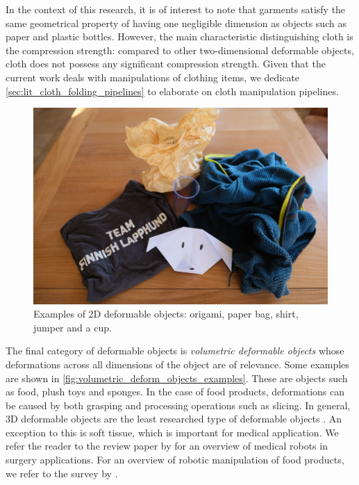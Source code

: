 In the context of this research, it is of interest to note that garments satisfy the same geometrical property of having one negligible dimension as objects such as paper and plastic bottles. However, the main characteristic distinguishing cloth is the compression strength: compared to other two-dimensional deformable objects, cloth does not possess any significant compression strength. Given that the current work deals with manipulations of clothing items, we dedicate \cref{sec:lit_cloth_folding_pipelines} to elaborate on cloth manipulation pipelines.

\begin{figure}[htbp!]
    \centering
    \includegraphics[keepaspectratio,width=\textwidth]{figures/fig_2d_deformables_ex.JPG}
    \caption[Examples of 2D deformable objects]{Examples of 2D deformable objects: origami, paper bag, shirt, jumper and a cup.}
    \label{fig:planar_deform_objects_examples}
\end{figure}

The final category of deformable objects is \textit{volumetric deformable objects} whose deformations across all dimensions of the object are of relevance. Some examples are shown in \cref{fig:volumetric_deform_objects_examples}. These are objects such as food, plush toys and sponges. In the case of food products, deformations can be caused by both grasping and processing operations such as slicing. In general, 3D deformable objects are the least researched type of deformable objects \autocite{Sanchez2018}. An exception to this is soft tissue, which is important for medical application. We refer the reader to the review paper by \textcite{Taylor2016} for an overview of medical robots in surgery applications. For an overview of robotic manipulation of food products, we refer to the survey by \textcite{Chua2003}.


